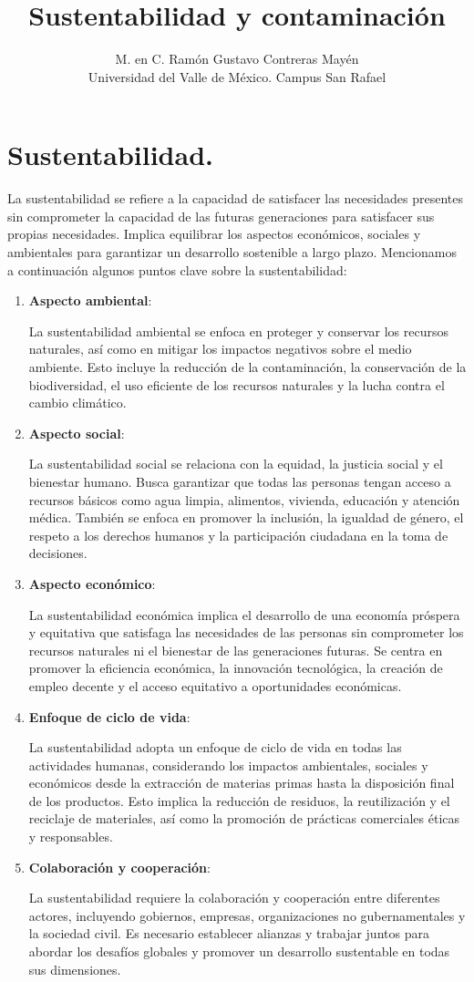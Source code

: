 \documentclass[12pt]{article}
\title{\vspace*{-2cm} Sustentabilidad y contaminación}
\author{M. en C. Ramón Gustavo Contreras Mayén \\ {\fontsize{14}{14}\selectfont Universidad del Valle de México. Campus San Rafael}}
\date{}
\begin{document}
\maketitle

\section{Sustentabilidad.}

La sustentabilidad se refiere a la capacidad de satisfacer las necesidades presentes sin comprometer la capacidad de las futuras generaciones para satisfacer sus propias necesidades. Implica equilibrar los aspectos económicos, sociales y ambientales para garantizar un desarrollo sostenible a largo plazo. Mencionamos a continuación algunos puntos clave sobre la sustentabilidad:
\begin{enumerate}
\item \textbf{Aspecto ambiental}:

La sustentabilidad ambiental se enfoca en proteger y conservar los recursos naturales, así como en mitigar los impactos negativos sobre el medio ambiente. Esto incluye la reducción de la contaminación, la conservación de la biodiversidad, el uso eficiente de los recursos naturales y la lucha contra el cambio climático.
\item \textbf{Aspecto social}:

La sustentabilidad social se relaciona con la equidad, la justicia social y el bienestar humano. Busca garantizar que todas las personas tengan acceso a recursos básicos como agua limpia, alimentos, vivienda, educación y atención médica. También se enfoca en promover la inclusión, la igualdad de género, el respeto a los derechos humanos y la participación ciudadana en la toma de decisiones.
\item \textbf{Aspecto económico}:

La sustentabilidad económica implica el desarrollo de una economía próspera y equitativa que satisfaga las necesidades de las personas sin comprometer los recursos naturales ni el bienestar de las generaciones futuras. Se centra en promover la eficiencia económica, la innovación tecnológica, la creación de empleo decente y el acceso equitativo a oportunidades económicas.
\item \textbf{Enfoque de ciclo de vida}:

La sustentabilidad adopta un enfoque de ciclo de vida en todas las actividades humanas, considerando los impactos ambientales, sociales y económicos desde la extracción de materias primas hasta la disposición final de los productos. Esto implica la reducción de residuos, la reutilización y el reciclaje de materiales, así como la promoción de prácticas comerciales éticas y responsables.
\item \textbf{Colaboración y cooperación}:

La sustentabilidad requiere la colaboración y cooperación entre diferentes actores, incluyendo gobiernos, empresas, organizaciones no gubernamentales y la sociedad civil. Es necesario establecer alianzas y trabajar juntos para abordar los desafíos globales y promover un desarrollo sustentable en todas sus dimensiones.
\end{enumerate}
\end{document}
